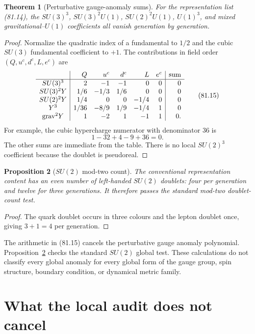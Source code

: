 \documentclass[11pt]{article}
\newtheorem{theorem}{Theorem}[section]
\newtheorem{proposition}[theorem]{Proposition}
\theoremstyle{remark}
\begin{document}
\begin{theorem}[Perturbative gauge-anomaly sums]
\label{thm:v15v81-sm-anomaly}
For the representation list (81.14), the
\(SU(3)^3\), \(SU(3)^2U(1)\), \(SU(2)^2U(1)\),
\(U(1)^3\), and mixed gravitational--\(U(1)\) coefficients all
vanish generation by generation.
\end{theorem}

\begin{proof}
Normalize the quadratic index of a fundamental to \(1/2\) and the
cubic \(SU(3)\) fundamental coefficient to \(+1\).  The
contributions in field order
\((Q,u^c,d^c,L,e^c)\) are
\[
\begin{array}{c|rrrrr|r}
&Q&u^c&d^c&L&e^c&\hbox{sum}\\ \hline
SU(3)^3&2&-1&-1&0&0&0\\
SU(3)^2Y&1/6&-1/3&1/6&0&0&0\\
SU(2)^2Y&1/4&0&0&-1/4&0&0\\
Y^3&1/36&-8/9&1/9&-1/4&1&0\\
{\rm grav}^2Y&1&-2&1&-1&1&0.
\end{array}                                             \tag{81.15}
\]
For example, the cubic hypercharge numerator with denominator
\(36\) is
\[
 1-32+4-9+36=0.
\]
The other sums are immediate from the table.  There is no local
\(SU(2)^3\) coefficient because the doublet is pseudoreal.
\end{proof}

\begin{proposition}[\(SU(2)\) mod-two count]
\label{prop:v15v81-witten}
The conventional representation content has an even number of
left-handed \(SU(2)\) doublets: four per generation and twelve for
three generations.  It therefore passes the standard mod-two
doublet-count test.
\end{proposition}

\begin{proof}
The quark doublet occurs in three colours and the lepton doublet
once, giving \(3+1=4\) per generation.
\end{proof}

The arithmetic in (81.15) cancels the perturbative gauge anomaly
polynomial.  Proposition~\ref{prop:v15v81-witten} checks the
standard \(SU(2)\) global test.  These calculations do not
classify every global anomaly for every global form of the gauge
group, spin structure, boundary condition, or dynamical metric
family.

\section{What the local audit does not cancel}
\end{document}
